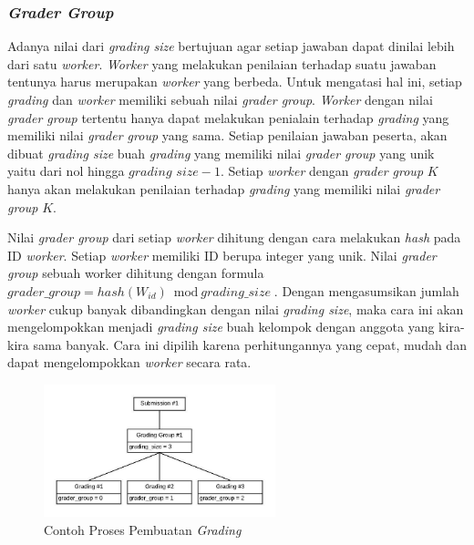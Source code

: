 \subsubsection{\textit{Grader Group}}

\par Adanya nilai dari \textit{grading size} bertujuan agar setiap jawaban dapat dinilai lebih dari satu \textit{worker}. \textit{Worker} yang melakukan penilaian terhadap suatu jawaban tentunya harus merupakan \textit{worker} yang berbeda. Untuk mengatasi hal ini, setiap \textit{grading} dan \textit{worker} memiliki sebuah nilai \textit{grader group}. \textit{Worker} dengan nilai \textit{grader group} tertentu hanya dapat melakukan penialain terhadap \textit{grading} yang memiliki nilai \textit{grader group} yang sama. Setiap penilaian jawaban peserta, akan dibuat \textit{grading size} buah \textit{grading} yang memiliki nilai \textit{grader group} yang unik yaitu dari nol hingga $\textit{grading size} - 1$. Setiap \textit{worker} dengan \textit{grader group} $K$ hanya akan melakukan penilaian terhadap \textit{grading} yang memiliki nilai \textit{grader group} $K$.

\par Nilai \textit{grader group} dari setiap \textit{worker} dihitung dengan cara melakukan \textit{hash} pada ID \textit{worker}. Setiap \textit{worker} memiliki ID berupa integer yang unik. Nilai \textit{grader group} sebuah worker dihitung dengan formula $\textit{grader\_group} = hash(W_{id}) \bmod \textit{grading\_size}$. Dengan mengasumsikan jumlah \textit{worker} cukup banyak dibandingkan dengan nilai \textit{grading size}, maka cara ini akan mengelompokkan menjadi \textit{grading size} buah kelompok dengan anggota yang kira-kira sama banyak. Cara ini dipilih karena perhitungannya yang cepat, mudah dan dapat mengelompokkan \textit{worker} secara rata.

\begin{figure}[ht!]
    \centering
    \includegraphics[width=0.6\textwidth]{images/grading-example-1}
    \caption{Contoh Proses Pembuatan \textit{Grading}}
    \label{fig:grading-example-1}
\end{figure}

